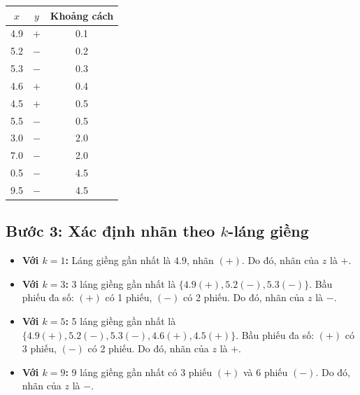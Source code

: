 \begin{table}[H]
    \centering
    \begin{tabular}{|c|c|c|}
        \hline
        \textbf{$x$} & \textbf{$y$} & \textbf{Khoảng cách} \\
        \hline
        4.9 & $+$ & 0.1 \\ \hline
        5.2 & $-$ & 0.2 \\ \hline
        5.3 & $-$ & 0.3 \\ \hline
        4.6 & $+$ & 0.4 \\ \hline
        4.5 & $+$ & 0.5 \\ \hline
        5.5 & $-$ & 0.5 \\ \hline
        3.0 & $-$ & 2.0 \\ \hline
        7.0 & $-$ & 2.0 \\ \hline
        0.5 & $-$ & 4.5 \\ \hline
        9.5 & $-$ & 4.5 \\ \hline
    \end{tabular}
\end{table}

\subsection*{Bước 3: Xác định nhãn theo $k$-láng giềng}
\begin{itemize}
    \item \textbf{Với $k = 1$:} Láng giềng gần nhất là $4.9$, nhãn $(+)$. Do đó, nhãn của $z$ là \textbf{$+$}.
    \item \textbf{Với $k = 3$:} 3 láng giềng gần nhất là $\{4.9 (+), 5.2 (-), 5.3 (-)\}$. Bầu phiếu đa số: $(+)$ có 1 phiếu, $(-)$ có 2 phiếu. Do đó, nhãn của $z$ là \textbf{$-$}.
    \item \textbf{Với $k = 5$:} 5 láng giềng gần nhất là $\{4.9 (+), 5.2 (-), 5.3 (-), 4.6 (+), 4.5 (+)\}$. Bầu phiếu đa số: $(+)$ có 3 phiếu, $(-)$ có 2 phiếu. Do đó, nhãn của $z$ là \textbf{$+$}.
    \item \textbf{Với $k = 9$:} 9 láng giềng gần nhất có 3 phiếu $(+)$ và 6 phiếu $(-)$. Do đó, nhãn của $z$ là \textbf{$-$}.
\end{itemize}